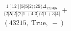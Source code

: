 \documentclass[varwidth, border=5pt]{standalone}
\begin{document}
\begin{my}
$\begin{gathered}
\scriptscriptstyle\frac{1[12][𝟓|𝟓|2⟩⟨2𝟓⟩Δ_{12|34|𝟓}}{⟨2|𝟓|2]⟨2|1+4|3]⟨2|1+3|4]} +\\
\scriptscriptstyle(43215,\;\text{True},\;-) \phantom{+}
\end{gathered}$
\end{my}
\end{document}
